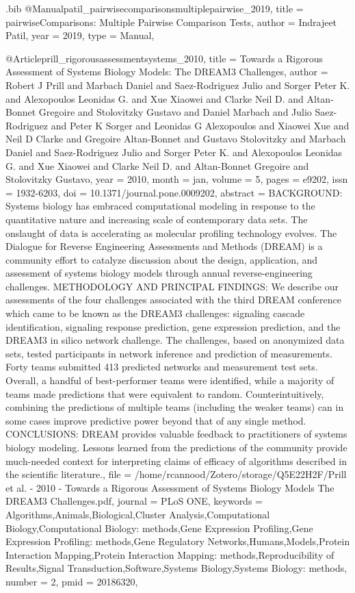 \documentclass[
  table,
  10pt,
  a4paper]{article}
\begin{document}
\begin{filecontents}{\jobname.bib}
@Manual{patil_pairwisecomparisonsmultiplepairwise_2019,
	title = {{{pairwiseComparisons}}: {{Multiple}} Pairwise Comparison Tests},
	author = {Indrajeet Patil},
	year = {2019},
	type = {Manual},
}

@Article{prill_rigorousassessmentsystems_2010,
	title = {Towards a {{Rigorous Assessment}} of {{Systems Biology Models}}: {{The DREAM3 Challenges}}},
	author = {Robert J Prill and Marbach Daniel and Saez-Rodriguez Julio and Sorger Peter K. and Alexopoulos Leonidas G. and Xue Xiaowei and Clarke Neil D. and Altan-Bonnet Gregoire and Stolovitzky Gustavo and Daniel Marbach and Julio Saez-Rodriguez and Peter K Sorger and Leonidas G Alexopoulos and Xiaowei Xue and Neil D Clarke and Gregoire Altan-Bonnet and Gustavo Stolovitzky and Marbach Daniel and Saez-Rodriguez Julio and Sorger Peter K. and Alexopoulos Leonidas G. and Xue Xiaowei and Clarke Neil D. and Altan-Bonnet Gregoire and Stolovitzky Gustavo},
	year = {2010},
	month = {jan},
	volume = {5},
	pages = {e9202},
	issn = {1932-6203},
	doi = {10.1371/journal.pone.0009202},
	abstract = {BACKGROUND: Systems biology has embraced computational modeling in response to the quantitative nature and increasing scale of contemporary data sets. The onslaught of data is accelerating as molecular profiling technology evolves. The Dialogue for Reverse Engineering Assessments and Methods (DREAM) is a community effort to catalyze discussion about the design, application, and assessment of systems biology models through annual reverse-engineering challenges. METHODOLOGY AND PRINCIPAL FINDINGS: We describe our assessments of the four challenges associated with the third DREAM conference which came to be known as the DREAM3 challenges: signaling cascade identification, signaling response prediction, gene expression prediction, and the DREAM3 in silico network challenge. The challenges, based on anonymized data sets, tested participants in network inference and prediction of measurements. Forty teams submitted 413 predicted networks and measurement test sets. Overall, a handful of best-performer teams were identified, while a majority of teams made predictions that were equivalent to random. Counterintuitively, combining the predictions of multiple teams (including the weaker teams) can in some cases improve predictive power beyond that of any single method. CONCLUSIONS: DREAM provides valuable feedback to practitioners of systems biology modeling. Lessons learned from the predictions of the community provide much-needed context for interpreting claims of efficacy of algorithms described in the scientific literature.},
	file = {/home/rcannood/Zotero/storage/Q5E22H2F/Prill et al. - 2010 - Towards a Rigorous Assessment of Systems Biology Models The DREAM3 Challenges.pdf},
	journal = {PLoS ONE},
	keywords = {Algorithms,Animals,Biological,Cluster Analysis,Computational Biology,Computational Biology: methods,Gene Expression Profiling,Gene Expression Profiling: methods,Gene Regulatory Networks,Humans,Models,Protein Interaction Mapping,Protein Interaction Mapping: methods,Reproducibility of Results,Signal Transduction,Software,Systems Biology,Systems Biology: methods},
	number = {2},
	pmid = {20186320},
}


\end{filecontents}
\end{document}
